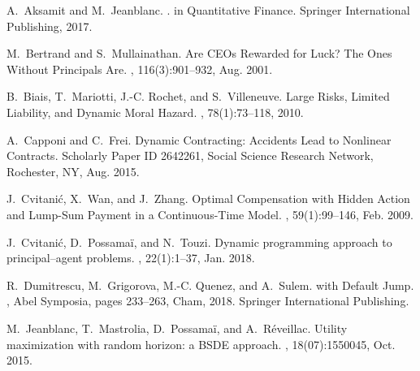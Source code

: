 \documentclass[numbook, envcountsect, envcountsame, envcountreset, runningheads, smallextended]{article}
\begin{document}
\newpage

\begin{thebibliography}{1}

A.~Aksamit and M.~Jeanblanc.
.
 in {Quantitative} {Finance}. Springer International
  Publishing, 2017.

%

 M.~Bertrand and S.~Mullainathan.
\newblock Are {CEOs} {Rewarded} for {Luck}? {The} {Ones} {Without} {Principals}
  {Are}.
, 116(3):901--932, Aug. 2001.

B.~Biais, T.~Mariotti, J.-C. Rochet, and S.~Villeneuve.
\newblock Large {Risks}, {Limited} {Liability}, and {Dynamic} {Moral} {Hazard}.
, 78(1):73--118, 2010.


A.~Capponi and C.~Frei.
\newblock Dynamic {Contracting}: {Accidents} {Lead} to {Nonlinear} {Contracts}.
 {Scholarly} {Paper} ID 2642261, Social Science Research
  Network, Rochester, NY, Aug. 2015.

J.~Cvitanić, X.~Wan, and J.~Zhang.
\newblock Optimal {Compensation} with {Hidden} {Action} and {Lump}-{Sum}
  {Payment} in a {Continuous}-{Time} {Model}.
, 59(1):99--146, Feb. 2009.
 
J.~Cvitanić, D.~Possamaï, and N.~Touzi.
\newblock Dynamic programming approach to principal–agent problems.
, 22(1):1--37, Jan. 2018.

R.~Dumitrescu, M.~Grigorova, M.-C. Quenez, and A.~Sulem.
 with {Default} {Jump}.
, Abel {Symposia}, pages 233--263, Cham, 2018.
  Springer International Publishing.

M.~Jeanblanc, T.~Mastrolia, D.~Possamaï, and A.~Réveillac.
\newblock Utility maximization with random horizon: a {BSDE} approach.
,
  18(07):1550045, Oct. 2015.
  
  


\end{thebibliography}
\end{document}
